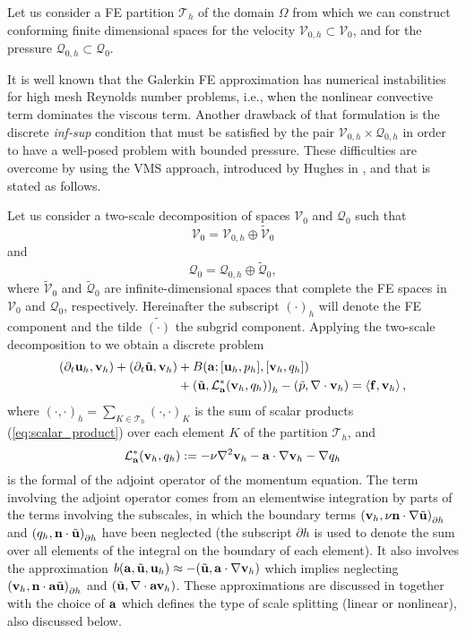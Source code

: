 Let us consider a FE partition $\mathcal{T}_h$ of the domain $\Omega$ from which we can construct conforming finite dimensional spaces for the velocity $\mathcal{V}_{0,h} \subset \mathcal{V}_0$, and for the pressure $\mathcal{Q}_{0,h}\subset \mathcal{Q}_0$. 

It is well known that the Galerkin FE approximation  has numerical instabilities for high mesh Reynolds number problems, i.e., when the nonlinear convective term dominates the viscous term. Another drawback of that formulation is the discrete \textit{inf-sup} condition that must be satisfied by the pair $\mathcal{V}_{0,h} \times\mathcal{Q}_{0,h}$ in order to have a well-posed problem with bounded pressure. These difficulties are overcome by using the VMS approach, introduced by Hughes in \cite{hughes,hughes}, and that is stated as follows.

Let us consider a two-scale decomposition of spaces $\mathcal{V}_0$ and $\mathcal{Q}_0$ such that $$\mathcal{V}_0=\mathcal{V}_{0,h}\oplus\widetilde{\mathcal{V}}_0$$ and $$\mathcal{Q}_0=\mathcal{Q}_{0,h}\oplus\widetilde{\mathcal{Q}}_0,$$ where $\widetilde{\mathcal{V}}_0$ and $\widetilde{\mathcal{Q}}_0$ are infinite-dimensional spaces that complete the FE spaces in $\mathcal{V}_0$ and $\mathcal{Q}_0$, respectively. Hereinafter the subscript $(\cdot)_h$ will denote the FE component and the tilde $\widetilde{(\cdot)}$ the subgrid component. Applying the two-scale decomposition to  we obtain a discrete problem
\begin{align}
\label{eq-C2_vms_NS_discrete}
(\partial_t{\bf u}_h,{\bf v}_h)+(\partial_t\tilde{{\bf u}},{\bf v}_h)&+B({\bf a};[{\bf u}_h,p_h],[{\bf v}_h,q_h])\\\nonumber
&+\left(\tilde{{\bf u}},\mathcal{L}_{{\bf a}}^*({\bf v}_h,q_h)\right)_h-\left(\tilde{p},\nabla\cdot{\bf v}_h\right)=\left<{\bf f},{\bf v}_h\right>,
\end{align}
where $(\cdot,\cdot)_h=\sum_{K\in\mathcal{T}_h}(\cdot,\cdot)_K$ is the sum of scalar products (\ref{eq:scalar_product}) over each element $K$ of the partition $\mathcal{T}_h$, and
\begin{equation}
\label{eq-C2_vms_adjoint}
\mathcal{L}_{{\bf a}}^*({\bf v}_h,q_h):=-\nu\nabla^2{\bf v}_h-{\bf a}\cdot\nabla{\bf v}_h-\nabla q_h
\end{equation}
is the formal of the adjoint operator of the momentum equation. The term involving the adjoint operator comes from an elementwise integration by parts of the terms involving the subscales, in which the boundary terms 
$\left( {\bf v}_{h},\nu {\bf n}\cdot \nabla \tilde{{\bf u}}\right)_{\partial h}$ and
$\left( q_{h},{\bf n}\cdot \tilde{{\bf u}}\right)_{\partial h}$
have been neglected (the subscript ${\partial h}$ is used to denote the sum over all elements of the integral on the boundary of each element). It also involves the approximation 
$b({\bf a},\tilde{{\bf u}},{\bf u}_h) \approx -(\tilde{{\bf u}},{\bf a}\cdot\nabla{\bf v}_h)$
which implies neglecting 
$\left( {\bf v}_{h},{\bf n}\cdot {\bf a} \tilde{{\bf u}}\right)_{\partial h}$ and
$(\tilde{{\bf u}},\nabla\cdot{\bf a}{\bf v}_h)$. 
These approximations are discussed in  \cite{codina_time_2007} together with the choice of ${\bf a}$ which defines the type of scale splitting (linear or nonlinear), also discussed below.

